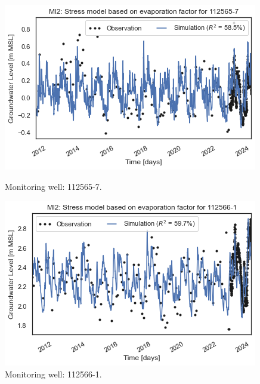 \begin{figure}[htbp]
    \centering
    \begin{minipage}{0.32\textwidth}
        \centering
        \includegraphics[width=\linewidth]{frontmatter/Rozenburg-fig/1125657(2).png}
        \caption{Monitoring well: 112565-7.}
        \label{fig:112565-7}
    \end{minipage}
    \hfill
    \begin{minipage}{0.32\textwidth}
        \centering
        \includegraphics[width=\linewidth]{frontmatter/Rozenburg-fig/1125661.png}
        \caption{Monitoring well: 112566-1.}
        \label{fig:112566-1}
    \end{minipage}
    \hfill
    \begin{minipage}{0.32\textwidth}
        \centering

\end{minipage}
\end{figure}
